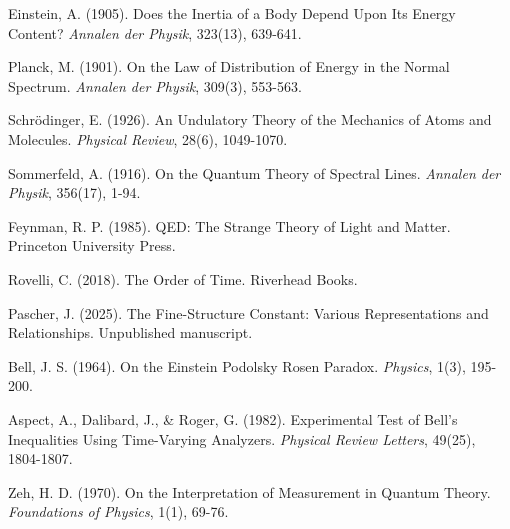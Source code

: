 \documentclass{article}
\begin{document}
\begin{thebibliography}{9}

 Einstein, A. (1905). Does the Inertia of a Body Depend Upon Its Energy Content? \textit{Annalen der Physik}, 323(13), 639-641.

 Planck, M. (1901). On the Law of Distribution of Energy in the Normal Spectrum. \textit{Annalen der Physik}, 309(3), 553-563.

 Schrödinger, E. (1926). An Undulatory Theory of the Mechanics of Atoms and Molecules. \textit{Physical Review}, 28(6), 1049-1070.

 Sommerfeld, A. (1916). On the Quantum Theory of Spectral Lines. \textit{Annalen der Physik}, 356(17), 1-94.

 Feynman, R. P. (1985). QED: The Strange Theory of Light and Matter. Princeton University Press.

 Rovelli, C. (2018). The Order of Time. Riverhead Books.

 Pascher, J. (2025). The Fine-Structure Constant: Various Representations and Relationships. Unpublished manuscript.

 Bell, J. S. (1964). On the Einstein Podolsky Rosen Paradox. \textit{Physics}, 1(3), 195-200.

 Aspect, A., Dalibard, J., \& Roger, G. (1982). Experimental Test of Bell's Inequalities Using Time-Varying Analyzers. \textit{Physical Review Letters}, 49(25), 1804-1807.

 Zeh, H. D. (1970). On the Interpretation of Measurement in Quantum Theory. \textit{Foundations of Physics}, 1(1), 69-76.

\end{thebibliography}
\end{document}
